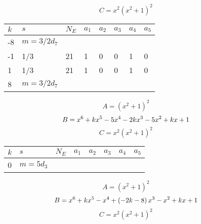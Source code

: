 \documentclass{amsart}
\begin{document}
$$C=x^2(x^2
 + 1)^{2}$$
\begin{longtable}{|l|l|l|lllll|}
\hline
$k$ & $s$ & $N_E$ & $a_1$ & $a_2$ & $a_3$ & $a_4$ & $a_5$\\
\hline
-8&$m=3/2d_{7}$&&\multicolumn{5}{c|}{}\\
-1&1/3&21&1&0&0&1&0\\
1&1/3&21&1&0&0&1&0\\
8&$m=3/2d_{7}$&&\multicolumn{5}{c|}{}\\
\hline
\end{longtable}
$$A=(x^2
 + 1)^{2}$$
$$B=x^6
 + k\*x^5
 - 5\*x^4
 - 2\*k\*x^3
 - 5\*x^2
 + k\*x
 + 1$$
$$C=x^2(x^2
 + 1)^{2}$$
\begin{longtable}{|l|l|l|lllll|}
\hline
$k$ & $s$ & $N_E$ & $a_1$ & $a_2$ & $a_3$ & $a_4$ & $a_5$\\
\hline
0&$m=5d_{3}$&&\multicolumn{5}{c|}{}\\
\hline
\end{longtable}
$$A=(x^2
 + 1)^{2}$$
$$B=x^6
 + k\*x^5
 - x^4
 + \left(-2\*k
 - 8\right) \*x^3
 - x^2
 + k\*x
 + 1$$
$$C=x^2(x^2
 + 1)^{2}$$
\end{document}
